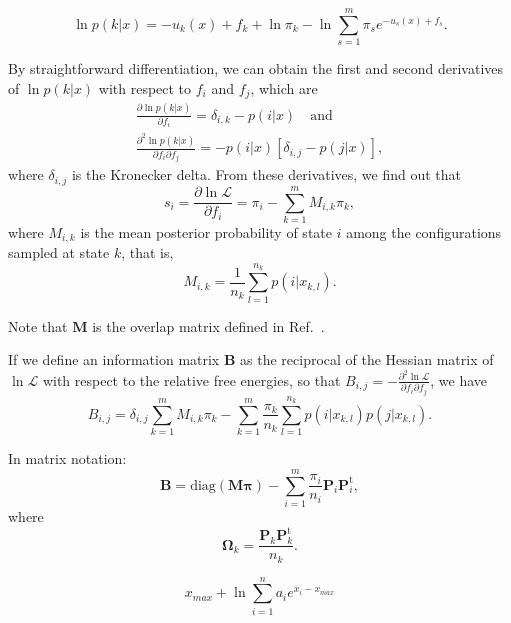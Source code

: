 \documentclass[aip,jcp,reprint,amsmath,amssymb]{revtex4-1}
\newcommand{\mt}[1]{\boldsymbol{\mathbf{#1}}}           %
\newcommand{\vt}[1]{\boldsymbol{\mathbf{#1}}}           %
\newcommand{\tr}[1]{#1^\text{t}}                        %
\begin{document}
\begin{equation*}
\ln p(k|x) = -u_k(x) + f_k + \ln \pi_k - \ln \sum_{s=1}^m \pi_s e^{-u_s(x) + f_s}.
\end{equation*}

By straightforward differentiation, we can obtain the first and second derivatives of $\ln p(k|x)$ with respect to $f_i$ and $f_j$, which are
\begin{gather*}
\frac{\partial \ln p(k|x)}{\partial f_i} = \delta_{i,k} - p(i|x) \quad \text{and} \\
\frac{\partial^2\ln p(k|x)}{\partial f_i \partial f_j} = -p(i|x)[\delta_{i,j} - p(j|x)],
\end{gather*}
where $\delta_{i,j}$ is the Kronecker delta. From these derivatives, we find out that
\begin{equation*}
s_i = \frac{\partial \ln \mathcal L}{\partial f_i} = \pi_i - \sum_{k=1}^m M_{i,k} \pi_k,
\end{equation*}
where $M_{i,k}$ is the mean posterior probability of state $i$ among the configurations sampled at state $k$, that is,
\begin{equation*}
M_{i,k} = \frac{1}{n_k} \sum_{l=1}^{n_k} p(i|x_{k,l}).
\end{equation*}

Note that $\mt M$ is the overlap matrix defined in Ref.~.

If we define an information matrix $\mt B$ as the reciprocal of the Hessian matrix of $\ln \mathcal L$ with respect to the relative free energies, so that $B_{i,j} = -\frac{\partial^2 \ln \mathcal L}{\partial f_i \partial f_j}$, we have
\begin{equation*}
B_{i,j} = \delta_{i,j} \sum_{k=1}^m M_{i,k} \pi_k - \sum_{k=1}^m \frac{\pi_k}{n_k} \sum_{l=1}^{n_k} p(i|x_{k,l})p(j|x_{k,l}).
\end{equation*}

In matrix notation:
\begin{equation*}
\mt B = \text{diag}(\mt M \vt \pi) - \sum_{i=1}^m \frac{\pi_i}{n_i} \mt P_i \tr{\mt P}_i,
\end{equation*}
where
\begin{equation*}
\mt \Omega_k = \frac{\mt P_k \tr{\mt P}_k}{n_k}.
\end{equation*}


\begin{equation}
x_{max} + \ln \sum_{i=1}^n a_i e^{x_i -x_{max}}
\end{equation}
\end{document}
